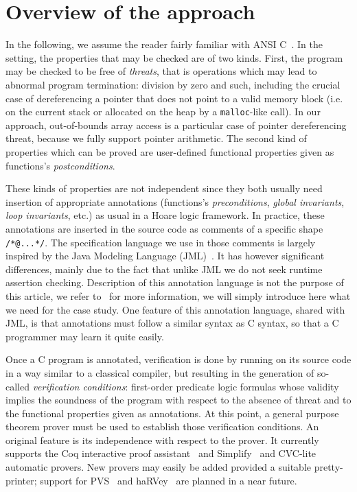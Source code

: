 \section{Overview of the \caduceus{} approach}
\label{sec:overview}

In the following, we assume the reader fairly familiar with ANSI
C~\cite{KR88}.  In the \caduceus{} setting, the properties that may be
checked are of two kinds. First, the program may be checked to be free
of \emph{threats}, that is operations which may lead to abnormal
program termination: division by zero and such, including the crucial
case of dereferencing a pointer that does not point to a valid memory
block (i.e. on the current stack or allocated on the heap by a
\texttt{malloc}-like call). In our approach, out-of-bounds array
access is a particular case of pointer dereferencing threat, because
we fully support pointer arithmetic.  The second kind of properties
which can be proved are user-defined functional properties given as
functions's \emph{postconditions}.

These kinds of properties are not independent since they both usually
need insertion of appropriate annotations (functions's
\emph{preconditions}, \emph{global invariants}, \emph{loop
  invariants}, etc.) as usual in a Hoare logic framework.  In
practice, these annotations are inserted in the source code as
comments of a specific shape \verb!/*@...*/!. The specification
language we use in those comments is largely inspired by the Java
Modeling Language (JML)~\cite{leavens00jml}. It has however
significant differences, mainly due to the fact that unlike JML we do
not seek runtime assertion checking. Description of this annotation
language is not the purpose of this article, we refer
to~\cite{Caduceus,filliatre04icfem} for more information, we will
simply introduce here what we need for the case study.
One feature of this annotation language, shared with JML, is that
annotations must follow a similar syntax as C syntax, so that a C
programmer may learn it quite easily.
 
Once a C program is annotated, verification is done by running
\caduceus{} on its source code in a way similar to a classical
compiler, but resulting in the generation of so-called
\emph{verification conditions}: first-order predicate logic formulas
whose validity implies the soundness of the program with respect to
the absence of threat and to the functional properties given as
annotations. At this point, a general purpose theorem prover must be
used to establish those verification conditions.  An original
\caduceus{} feature is its independence with respect to the prover. It
currently supports the Coq interactive proof
assistant~\cite{CoqProofAssistant} and Simplify~\cite{simplify} and
CVC-lite~\cite{barrett04cav} automatic provers. New provers may easily be
added provided a suitable pretty-printer; support for PVS~\cite{PVS}
and haRVey~\cite{ranise03harvey} are planned in a near future.

